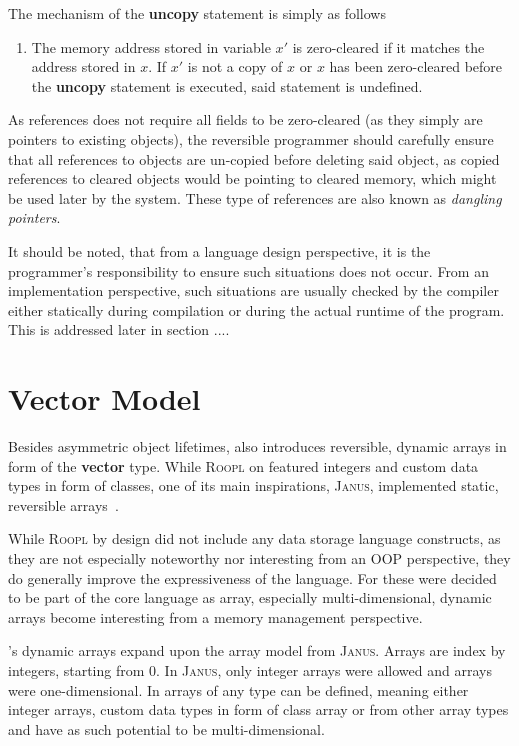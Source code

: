 The mechanism of the \textbf{uncopy} statement is simply as follows
\begin{enumerate}
    \item The memory address stored in variable $x'$ is zero-cleared if it matches the address stored in $x$. If $x'$ is not a copy of $x$ or $x$ has been zero-cleared before the \textbf{uncopy} statement is executed, said statement is undefined.
\end{enumerate}
As references does not require all fields to be zero-cleared (as they simply are pointers to existing objects), the reversible programmer should carefully ensure that all references to objects are un-copied before deleting said object, as copied references to cleared objects would be pointing to cleared memory, which might be used later by the system. These type of references are also known as \textit{dangling pointers}.

It should be noted, that from a language design perspective, it is the programmer's responsibility to ensure such situations does not occur. From an implementation perspective, such situations are usually checked by the compiler either statically during compilation or during the actual runtime of the program. This is addressed later in section .... %


\section{Vector Model}
\label{sec:vector-model}
Besides asymmetric object lifetimes, \rooplpp also introduces reversible, dynamic arrays in form of the \textbf{vector} type. While \textsc{Roopl} on featured integers and custom data types in form of classes, one of its main inspirations, \textsc{Janus}, implemented static, reversible arrays~\cite{ty:janus}.

While \textsc{Roopl} by design did not include any data storage language constructs, as they are not especially noteworthy nor interesting from an OOP perspective, they do generally improve the expressiveness of the language. For \rooplpp these were decided to be part of the core language as array, especially multi-dimensional, dynamic arrays become interesting from a memory management perspective.

\rooplpp's dynamic arrays expand upon the array model from \textsc{Janus}. Arrays are index by integers, starting from 0. In \textsc{Janus}, only integer arrays were allowed and arrays were one-dimensional. In \rooplpp arrays of any type can be defined, meaning either integer arrays, custom data types in form of class array or from other array types and have as such potential to be multi-dimensional. 

